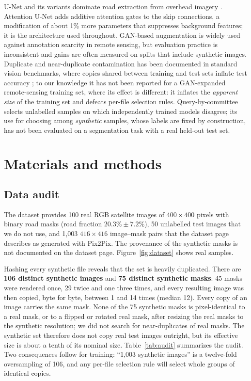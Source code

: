 \documentclass[11pt]{article}
\begin{document}
U-Net \citep{ronneberger2015} and its variants dominate road extraction from overhead imagery \citep{zhang2018,zhou2018,batra2019}. Attention U-Net \citep{oktay2018} adds additive attention gates to the skip connections, a modification of about 1\% more parameters that suppresses background features; it is the architecture used throughout. GAN-based augmentation \citep{goodfellow2014,isola2017} is widely used against annotation scarcity in remote sensing, but evaluation practice is inconsistent and gains are often measured on splits that include synthetic images. Duplicate and near-duplicate contamination has been documented in standard vision benchmarks, where copies shared between training and test sets inflate test accuracy \citep{barz2020}; to our knowledge it has not been reported for a GAN-expanded remote-sensing training set, where its effect is different: it inflates the \emph{apparent size} of the training set and defeats per-file selection rules. Query-by-committee \citep{seung1992,settles2009} selects unlabelled samples on which independently trained models disagree; its use for choosing among \emph{synthetic} samples, whose labels are fixed by construction, has not been evaluated on a segmentation task with a real held-out test set.

\section{Materials and methods}

\subsection{Data audit}

The dataset provides 100 real RGB satellite images of $400\times400$ pixels with binary road masks (road fraction $20.3\%\pm7.2\%$), 50 unlabelled test images that we do not use, and 1{,}003 $416\times416$ image--mask pairs that the dataset page describes as generated with Pix2Pix. The provenance of the synthetic masks is not documented on the dataset page. Figure~\ref{fig:dataset} shows real samples.

Hashing every synthetic file reveals that the set is heavily duplicated. There are \textbf{106 distinct synthetic images} and \textbf{75 distinct synthetic masks}: 45 masks were rendered once, 29 twice and one three times, and every resulting image was then copied, byte for byte, between 1 and 14 times (median 12). Every copy of an image carries the same mask. None of the 75 synthetic masks is pixel-identical to a real mask, or to a flipped or rotated real mask, after resizing the real masks to the synthetic resolution; we did not search for near-duplicates of real masks. The synthetic set therefore does not copy real test images outright, but its effective size is about a tenth of its nominal size. Table~\ref{tab:audit} summarizes the audit. Two consequences follow for training: ``1{,}003 synthetic images'' is a twelve-fold oversampling of 106, and any per-file selection rule will select whole groups of identical copies.
\end{document}
